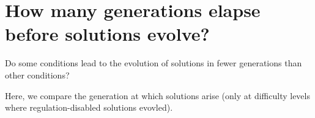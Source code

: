 \documentclass[]{book}
\newenvironment{Shaded}{\begin{snugshade}}{\end{snugshade}}
\newcommand{\DecValTok}[1]{\textcolor[rgb]{0.00,0.00,0.81}{#1}}
\newcommand{\KeywordTok}[1]{\textcolor[rgb]{0.13,0.29,0.53}{\textbf{#1}}}
\newcommand{\NormalTok}[1]{#1}
\newcommand{\OperatorTok}[1]{\textcolor[rgb]{0.81,0.36,0.00}{\textbf{#1}}}
\newcommand{\StringTok}[1]{\textcolor[rgb]{0.31,0.60,0.02}{#1}}
\begin{document}
\hypertarget{how-many-generations-elapse-before-solutions-evolve}{%
\section{How many generations elapse before solutions evolve?}\label{how-many-generations-elapse-before-solutions-evolve}}

Do some conditions lead to the evolution of solutions in fewer generations than other conditions?

Here, we compare the generation at which solutions arise (only at difficulty levels where regulation-disabled solutions evovled).

\begin{Shaded}
\end{Shaded}
\end{document}
